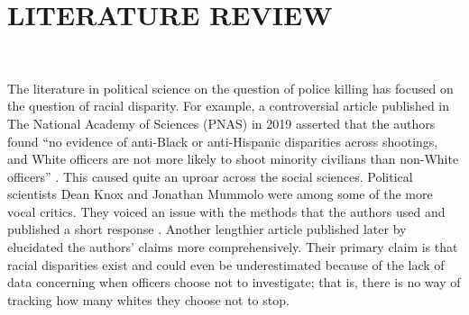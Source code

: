 \documentclass[12pt]{article}
\begin{document}


\section{LITERATURE REVIEW}\

The literature in political science on the question of police killing has focused on the question of racial disparity. For example, a controversial article published in The National Academy of Sciences (PNAS) in 2019 asserted that the authors found “no evidence of anti-Black or anti-Hispanic disparities across shootings, and White officers are not more likely to shoot minority civilians than non-White officers” \parencite[15877]{johnsonOfficerCharacteristicsRacial2019}. This caused quite an uproar across the social sciences. Political scientists Dean Knox and Jonathan Mummolo were among some of the more vocal critics. They voiced an issue with the methods that the authors used and published a short response \parencite{knoxMakingInferencesRacial2020}. Another lengthier article published later by \textcite{knoxAdministrativeRecordsMask2020} elucidated the authors’ claims more comprehensively. Their primary claim is that racial disparities exist and could even be underestimated because of the lack of data concerning when officers choose not to investigate; that is, there is no way of tracking how many whites they choose not to stop.
\end{document}
